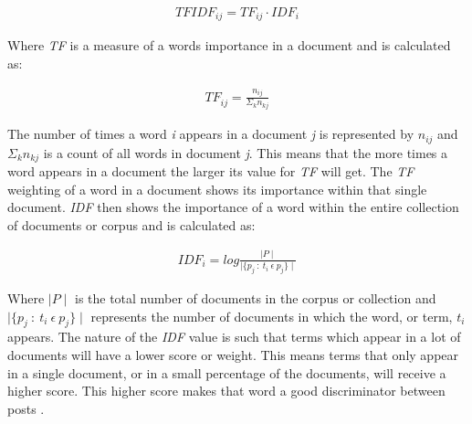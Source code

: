 \begin{align}
	TFID{F}_{{ij}}=T{F}_{{ij}}\cdot ID{F}_{{i}}
\end{align}

Where \textit{TF} is a measure of a words importance in a document and is calculated as:

\begin{align}
	T{F}_{{{\dot{i}}j}}=\frac {{n}_{{ij}}}{{\Sigma }_{{k}}{n}_{{kj}}}
\end{align}

The number of times a word \textit{i} appears in a document \textit{j} is represented by ${{n}_{{ij}}}$ and ${{\Sigma }_{{k}}{n}_{{kj}}}$ is a count of all words in document \textit{j}. This means that the more times a word appears in a document the larger its value for \textit{TF} will get. The \textit{TF} weighting of a word in a document shows its importance within that single document. \textit{IDF} then shows the importance of a word within the entire collection of documents or corpus and is calculated as:

\begin{align}
	ID{F}_{{i}}={log{\frac {\mid{P}\mid}{\mid{\{{{p}_{{j}} \:: \: {t}_{{i}} \: \epsilon \: {p}_{{j}}}\}}\mid}}}
\end{align}

Where $\mid{P}\mid$ is the total number of documents in the corpus or collection and $\mid{\{{{p}_{{j}} \:: \: {t}_{{i}} \: \epsilon \: {p}_{{j}}}\}}\mid$ represents the number of documents in which the word, or term, ${t}_{{i}}$ appears. The nature of the \textit{IDF} value is such that terms which appear in a lot of documents will have a lower score or weight. This means terms that only appear in a single document, or in a small percentage of the documents, will receive a higher score. This higher score makes that word a good discriminator between posts \cite{yin_detection_2009}. 

